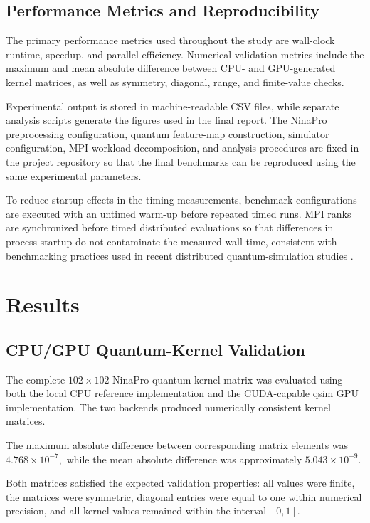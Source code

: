 \documentclass[pdflatex,sn-mathphys-num]{sn-jnl}%
\theoremstyle{thmstyleone}%
\theoremstyle{thmstyletwo}%
\theoremstyle{thmstylethree}%
\begin{document}
\subsection{Performance Metrics and Reproducibility}
\label{subsec:metrics}

The primary performance metrics used throughout the study are wall-clock
runtime, speedup, and parallel efficiency. Numerical validation metrics include
the maximum and mean absolute difference between CPU- and GPU-generated kernel
matrices, as well as symmetry, diagonal, range, and finite-value checks.

Experimental output is stored in machine-readable CSV files, while separate
analysis scripts generate the figures used in the final report. The NinaPro
preprocessing configuration, quantum feature-map construction, simulator
configuration, MPI workload decomposition, and analysis procedures are fixed in
the project repository so that the final benchmarks can be reproduced using the
same experimental parameters.

To reduce startup effects in the timing measurements, benchmark configurations
are executed with an untimed warm-up before repeated timed runs. MPI ranks are
synchronized before timed distributed evaluations so that differences in
process startup do not contaminate the measured wall time, consistent with
benchmarking practices used in recent distributed quantum-simulation studies
\cite{brown2026}.

\section{Results}\label{sec:results}

\subsection{CPU/GPU Quantum-Kernel Validation}
\label{subsec:kernel-validation-results}

The complete $102\times102$ NinaPro quantum-kernel matrix was evaluated using
both the local CPU reference implementation and the CUDA-capable qsim GPU
implementation. The two backends produced numerically consistent kernel
matrices.

The maximum absolute difference between corresponding matrix elements was \(4.768\times10^{-7},\) while the mean absolute difference was approximately \(5.043\times10^{-9}.\)

Both matrices satisfied the expected validation properties: all values were
finite, the matrices were symmetric, diagonal entries were equal to one within
numerical precision, and all kernel values remained within the interval
$[0,1]$.
\end{document}
